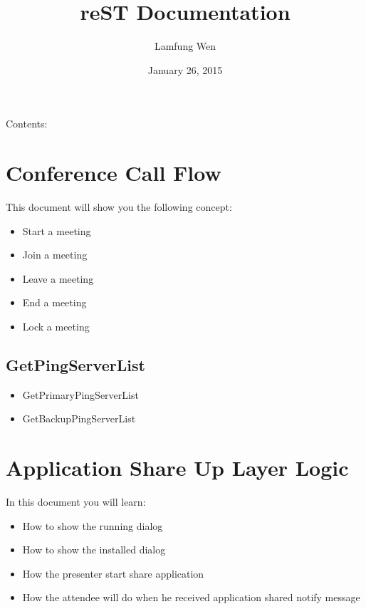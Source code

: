 \documentclass[letterpaper,10pt,english]{sphinxmanual}
\title{reST Documentation}
\date{January 26, 2015}
\author{Lamfung Wen}
\begin{document}
\maketitle
\tableofcontents
{}\label{index::doc}


Contents:


\chapter{Conference Call Flow}
\label{conf_callflow:conference-call-flow}\label{conf_callflow::doc}\label{conf_callflow:welcome-to-lamfung-s-documentation}
This document will show you the following concept:
\begin{itemize}
\item {} 
Start a meeting

\item {} 
Join a meeting

\item {} 
Leave a meeting

\item {} 
End a meeting

\item {} 
Lock a meeting

\end{itemize}


\section{GetPingServerList}
\label{conf_callflow:getpingserverlist}\begin{itemize}
\item {} 
GetPrimaryPingServerList

\item {} 
GetBackupPingServerList

\end{itemize}


\chapter{Application Share Up Layer Logic}
\label{app_share:application-share-up-layer-logic}\label{app_share::doc}
In this document you will learn:
\begin{itemize}
\item {} 
How to show the running dialog

\item {} 
How to show the installed dialog

\item {} 
How the presenter start share application

\item {} 
How the attendee will do when he received application shared notify message

\end{itemize}
\end{document}
